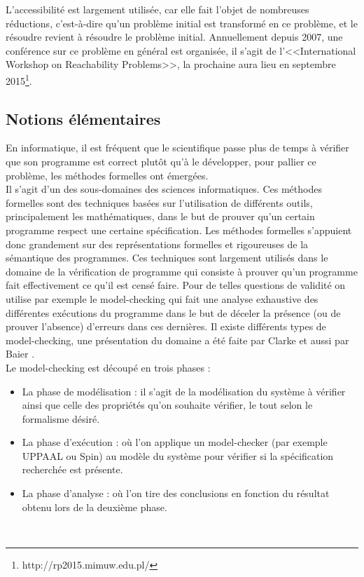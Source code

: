 \documentclass[a4paper]{report}
\theoremstyle{break}
\theoremstyle{breakplain}
\begin{document}
L'accessibilité est largement utilisée, car elle fait l'objet de nombreuses réductions, c'est-à-dire qu'un problème initial est transformé en ce problème, et le résoudre revient à résoudre le problème initial. Annuellement depuis 2007, une conférence sur ce problème en général est organisée, il s'agit de l'<<International Workshop on Reachability Problems>>, la prochaine aura lieu en septembre 2015\footnote{http://rp2015.mimuw.edu.pl/}.\\


\subsection{Notions élémentaires}
En informatique, il est fréquent que le scientifique passe plus de temps à vérifier que son programme est correct plutôt qu'à le développer, pour pallier ce problème, les méthodes formelles ont émergées.\\
Il s'agit d'un des sous-domaines des sciences informatiques. Ces méthodes formelles sont des techniques basées sur l'utilisation de différents outils, principalement les mathématiques, dans le but de prouver qu'un certain programme respect une certaine spécification. Les méthodes formelles s'appuient donc grandement sur des représentations formelles et rigoureuses de la sémantique des programmes. Ces techniques sont largement utilisés dans le domaine de la vérification de programme qui consiste à prouver qu'un programme fait effectivement ce qu'il est censé faire. Pour de telles questions de validité on utilise par exemple le model-checking qui fait une analyse exhaustive des différentes exécutions du programme dans le but de déceler la présence (ou de prouver l'absence) d'erreurs dans ces dernières. Il existe différents types de model-checking, une présentation du domaine a été faite par Clarke \cite{clarke1999model} et aussi par Baier \cite{baier2008principles}.\\

Le model-checking est découpé en trois phases :
\begin{itemize}
\item La phase de modélisation : il s'agit de la modélisation du système à vérifier ainsi que celle des propriétés qu'on souhaite vérifier, le tout selon le formalisme désiré.
\item La phase d'exécution : où l'on applique un model-checker (par exemple UPPAAL ou Spin) au modèle du système pour vérifier si la spécification recherchée est présente.
\item La phase d'analyse : où l'on tire des conclusions en fonction du résultat obtenu lors de la deuxième phase.
\end{itemize}
\phantom\\
\end{document}

